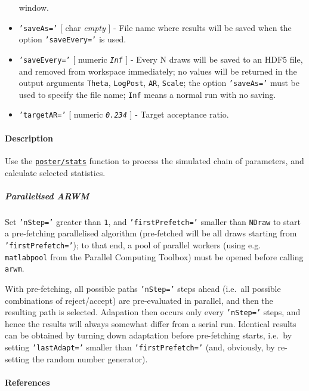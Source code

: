 \begin{itemize}
  window.
\item
  \texttt{'saveAs='} {[} char \textbar{} \emph{empty} {]} - File name
  where results will be saved when the option \texttt{'saveEvery='} is
  used.
\item
  \texttt{'saveEvery='} {[} numeric \textbar{} \emph{\texttt{Inf}} {]} -
  Every N draws will be saved to an HDF5 file, and removed from
  workspace immediately; no values will be returned in the output
  arguments \texttt{Theta}, \texttt{LogPost}, \texttt{AR},
  \texttt{Scale}; the option \texttt{'saveAs='} must be used to specify
  the file name; \texttt{Inf} means a normal run with no saving.
\item
  \texttt{'targetAR='} {[} numeric \textbar{} \emph{\texttt{0.234}} {]}
  - Target acceptance ratio.
\end{itemize}

\paragraph{Description}

Use the \href{poster/stats}{\texttt{poster/stats}} function to process
the simulated chain of parameters, and calculate selected statistics.

\subparagraph{Parallelised ARWM}

Set \texttt{'nStep='} greater than \texttt{1}, and
\texttt{'firstPrefetch='} smaller than \texttt{NDraw} to start a
pre-fetching parallelised algorithm (pre-fetched will be all draws
starting from \texttt{'firstPrefetch='}); to that end, a pool of
parallel workers (using e.g. \texttt{matlabpool} from the Parallel
Computing Toolbox) must be opened before calling \texttt{arwm}.

With pre-fetching, all possible paths \texttt{'nStep='} steps ahead
(i.e.~all possible combinations of reject/accept) are pre-evaluated in
parallel, and then the resulting path is selected. Adapation then occurs
only every \texttt{'nStep='} steps, and hence the results will always
somewhat differ from a serial run. Identical results can be obtained by
turning down adaptation before pre-fetching starts, i.e.~by setting
\texttt{'lastAdapt='} smaller than \texttt{'firstPrefetch='} (and,
obviously, by re-setting the random number generator).

\paragraph{References}

